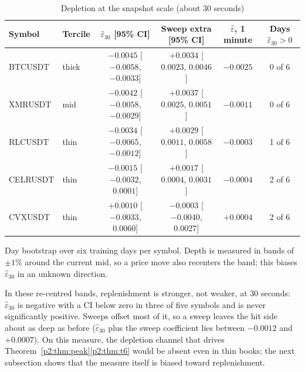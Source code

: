 \begin{table}[t]\centering\small
\begin{threeparttable}
\caption{Depletion at the snapshot scale (about 30 seconds)}\label{p2:tab:x8}
\setlength{\tabcolsep}{2.5pt}
\begin{tabular}{llcccc}
\toprule
Symbol & Tercile & $\hat\varepsilon_{30}$ [95\% CI] & Sweep extra [95\% CI] & $\hat\varepsilon$, 1 minute & Days $\hat\varepsilon_{30}>0$\\
\midrule
BTCUSDT & thick & $-0.0045$ [$-0.0058$, $-0.0033$] & $+0.0034$ [$0.0023$, $0.0046$] & $-0.0025$ & 0 of 6\\
XMRUSDT & mid & $-0.0042$ [$-0.0058$, $-0.0029$] & $+0.0037$ [$0.0025$, $0.0051$] & $-0.0011$ & 0 of 6\\
RLCUSDT & thin & $-0.0034$ [$-0.0065$, $-0.0012$] & $+0.0029$ [$0.0011$, $0.0058$] & $-0.0003$ & 1 of 6\\
CELRUSDT & thin & $-0.0015$ [$-0.0032$, $0.0001$] & $+0.0017$ [$0.0004$, $0.0031$] & $-0.0004$ & 2 of 6\\
CVXUSDT & thin & $+0.0010$ [$-0.0033$, $0.0060$] & $-0.0003$ [$-0.0040$, $0.0027$] & $+0.0004$ & 2 of 6\\
\bottomrule
\end{tabular}
\begin{tablenotes}\footnotesize\item Day bootstrap over six training days per symbol. Depth is measured in bands of $\pm1\%$ around the current mid, so a price move also recenters the band; this biases $\hat\varepsilon_{30}$ in an unknown direction. \end{tablenotes}
\end{threeparttable}
\end{table}

In these re-centred bands, replenishment is stronger, not weaker, at 30 seconds: $\hat\varepsilon_{30}$ is negative with a CI below zero in three of five symbols and is never significantly positive. Sweeps offset most of it, so a sweep leaves the hit side about as deep as before ($\hat\varepsilon_{30}$ plus the sweep coefficient lies between $-0.0012$ and $+0.0007$). On this measure, the depletion channel that drives Theorem~\ref{p2:thm:peak}\ref{p2:thm:t6} would be absent even in thin books; the next subsection shows that the measure itself is biased toward replenishment.

